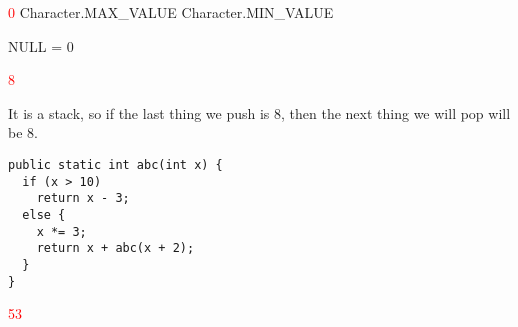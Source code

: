 \documentclass[11pt,addpoints]{exam}
\begin{document}
\begin{questions}
\begin{minipage}{\textwidth}
\end{minipage}


\begin{minipage}{\textwidth}

\begin{choices}
  \choice \textcolor{red}{0}
  \choice Character.MAX\_VALUE
  \choice Character.MIN\_VALUE
   \\ 
\end{choices}
\end{minipage}

NULL = 0 \\

\begin{minipage}{\textwidth}

\begin{choices}
  \choice \textcolor{red}{8}
   \\
\end{choices}
\end{minipage}

It is a stack, so if the last thing we push is 8, then the next thing we will pop will be 8. \\

\begin{minipage}{\textwidth}



\begin{verbatim}
public static int abc(int x) {
  if (x > 10)
    return x - 3;
  else {
    x *= 3;
    return x + abc(x + 2);
  }
}
\end{verbatim}

\begin{choices}
  \choice \textcolor{red}{53}
   \\
\end{choices}


\end{minipage}
\end{questions}
\end{document}
